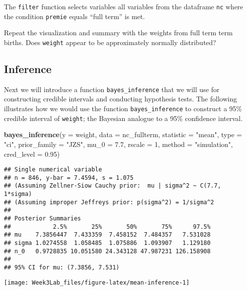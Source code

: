 \documentclass[]{article}
\newenvironment{Shaded}{\begin{snugshade}}{\end{snugshade}}
\newcommand{\KeywordTok}[1]{\textcolor[rgb]{0.13,0.29,0.53}{\textbf{#1}}}
\newcommand{\DataTypeTok}[1]{\textcolor[rgb]{0.13,0.29,0.53}{#1}}
\newcommand{\DecValTok}[1]{\textcolor[rgb]{0.00,0.00,0.81}{#1}}
\newcommand{\FloatTok}[1]{\textcolor[rgb]{0.00,0.00,0.81}{#1}}
\newcommand{\StringTok}[1]{\textcolor[rgb]{0.31,0.60,0.02}{#1}}
\newcommand{\NormalTok}[1]{#1}
\begin{document}
The \texttt{filter} function selects variables all variables from the
dataframe \texttt{nc} where the condition \texttt{premie} equals ``full
term'' is met.

Repeat the visualization and summary with the weights from full term
term births. Does \texttt{weight} appear to be approximately normally
distributed?

\subsection{Inference}\label{inference}

Next we will introduce a function \texttt{bayes\_inference} that we will
use for constructing credible intervals and conducting hypothesis tests.
The following illustrates how we would use the function
\texttt{bayes\_inference} to construct a 95\% credible interval of
\texttt{weight}; the Bayesian analogue to a 95\% confidence interval.

\begin{Shaded}
\begin{Highlighting}[]
\KeywordTok{bayes_inference}\NormalTok{(}\DataTypeTok{y =}\NormalTok{ weight, }\DataTypeTok{data =}\NormalTok{ nc_fullterm, }
                \DataTypeTok{statistic =} \StringTok{"mean"}\NormalTok{, }\DataTypeTok{type =} \StringTok{"ci"}\NormalTok{,  }
                \DataTypeTok{prior_family =} \StringTok{"JZS"}\NormalTok{, }\DataTypeTok{mu_0 =} \FloatTok{7.7}\NormalTok{, }\DataTypeTok{rscale =} \DecValTok{1}\NormalTok{,}
                \DataTypeTok{method =} \StringTok{"simulation"}\NormalTok{,}
                \DataTypeTok{cred_level =} \FloatTok{0.95}\NormalTok{)}
\end{Highlighting}
\end{Shaded}

\begin{verbatim}
## Single numerical variable
## n = 846, y-bar = 7.4594, s = 1.075
## (Assuming Zellner-Siow Cauchy prior:  mu | sigma^2 ~ C(7.7, 1*sigma)
## (Assuming improper Jeffreys prior: p(sigma^2) = 1/sigma^2
## 
## Posterior Summaries
##            2.5%       25%       50%       75%      97.5%
## mu    7.3856447  7.433359  7.458152  7.484357   7.531028
## sigma 1.0274558  1.058485  1.075886  1.093907   1.129180
## n_0   0.9728835 10.051580 24.343128 47.987231 126.158908
## 
## 95% CI for mu: (7.3856, 7.531)
\end{verbatim}

\begin{center}\texttt{[image: Week3Lab\_files/figure-latex/mean-inference-1]} \end{center}
\end{document}
